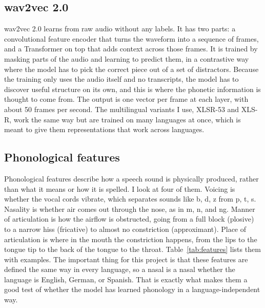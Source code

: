 \documentclass[twoside,11pt]{article}
\begin{document}
\subsection{wav2vec 2.0}
wav2vec 2.0 learns from raw audio without any labels. It has two parts: a
convolutional feature encoder that turns the waveform into a sequence of frames,
and a Transformer on top that adds context across those frames. It is trained by
masking parts of the audio and learning to predict them, in a contrastive way where
the model has to pick the correct piece out of a set of distractors. Because the
training only uses the audio itself and no transcripts, the model has to discover
useful structure on its own, and this is where the phonetic information is thought
to come from. The output is one vector per frame at each layer, with about 50 frames
per second. The multilingual variants I use, XLSR-53 and XLS-R, work the same way
but are trained on many languages at once, which is meant to give them
representations that work across languages.

\subsection{Phonological features}
Phonological features describe how a speech sound is physically produced, rather
than what it means or how it is spelled. I look at four of them. Voicing is whether
the vocal cords vibrate, which separates sounds like b, d, z from p, t, s.
Nasality is whether air comes out through the nose, as in m, n, and ng. Manner of
articulation is how the airflow is obstructed, going from a full block (plosive) to
a narrow hiss (fricative) to almost no constriction (approximant). Place of
articulation is where in the mouth the constriction happens, from the lips to the
tongue tip to the back of the tongue to the throat. Table~\ref{tab:features} lists
them with examples. The important thing for this project is that these features are
defined the same way in every language, so a nasal is a nasal whether the language
is English, German, or Spanish. That is exactly what makes them a good test of
whether the model has learned phonology in a language-independent way.
\end{document}
